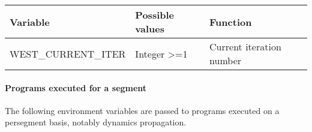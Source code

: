 \documentclass[letterpaper,10pt,english]{sphinxmanual}
\begin{document}
\begin{savenotes}\sphinxattablestart
\centering
\begin{tabulary}{\linewidth}[t]{|T|T|T|}
\hline
\sphinxstyletheadfamily 
Variable
&\sphinxstyletheadfamily 
Possible values
&\sphinxstyletheadfamily 
Function
\\
\hline
WEST\_CURRENT\_ITER
&
Integer \textgreater{}=1
&
Current iteration number
\\
\hline
\end{tabulary}
\par
\sphinxattableend\end{savenotes}


\paragraph{Programs executed for a segment}
\label{\detokenize{users_guide/west/setup:programs-executed-for-a-segment}}
The following environment variables are passed to programs executed on a
per\sphinxhyphen{}segment basis, notably dynamics propagation.
\end{document}
